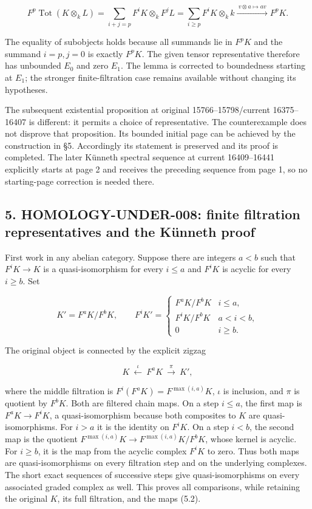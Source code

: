 \[
F^p\operatorname{Tot}(K\otimes_k L)
=\sum_{i+j=p}F^iK\otimes_k F^jL
=\sum_{i\geq p}F^iK\otimes_k k
\xrightarrow{\ v\otimes a\mapsto av\ }F^pK.
\]

The equality of subobjects holds because all summands lie in \(F^pK\) and the summand \(i=p,j=0\) is exactly \(F^pK\). The given tensor representative therefore has unbounded \(E_0\) and zero \(E_1\). The lemma is corrected to boundedness starting at \(E_1\); the stronger finite-filtration case remains available without changing its hypotheses.

The subsequent existential proposition at original 15766--15798/current 16375--16407 is different: it permits a choice of representative. The counterexample does not disprove that proposition. Its bounded initial page can be achieved by the construction in §5. Accordingly its statement is preserved and its proof is completed. The later Künneth spectral sequence at current 16409--16441 explicitly starts at page 2 and receives the preceding sequence from page 1, so no starting-page correction is needed there.

\subsection{5. HOMOLOGY-UNDER-008: finite filtration representatives and the Künneth proof}\label{note-07-homology-under-008-finite-filtration-representatives-and-the-kuxfcnneth-proof}

First work in any abelian category. Suppose there are integers \(a<b\) such that \(F^iK\to K\) is a quasi-isomorphism for every \(i\leq a\) and \(F^iK\) is acyclic for every \(i\geq b\). Set

\[
K'=F^aK/F^bK,
\qquad
F^iK'=
\begin{cases}
F^aK/F^bK&i\leq a,\\
F^iK/F^bK&a<i<b,\\
0&i\geq b.
\end{cases}                                  \tag{5.1}
\]

The original object is connected by the explicit zigzag

\[
K\ \xleftarrow{\iota}\ F^aK\ \xrightarrow{\pi}\ K',       \tag{5.2}
\]

where the middle filtration is \(F^i(F^aK)=F^{\max(i,a)}K\), \(\iota\) is inclusion, and \(\pi\) is quotient by \(F^bK\). Both are filtered chain maps. On a step \(i\leq a\), the first map is \(F^aK\to F^iK\), a quasi-isomorphism because both composites to \(K\) are quasi-isomorphisms. For \(i>a\) it is the identity on \(F^iK\). On a step \(i<b\), the second map is the quotient \(F^{\max(i,a)}K\to F^{\max(i,a)}K/F^bK\), whose kernel is acyclic. For \(i\geq b\), it is the map from the acyclic complex \(F^iK\) to zero. Thus both maps are quasi-isomorphisms on every filtration step and on the underlying complexes. The short exact sequences of successive steps give quasi-isomorphisms on every associated graded complex as well. This proves all comparisons, while retaining the original \(K\), its full filtration, and the maps (5.2).

